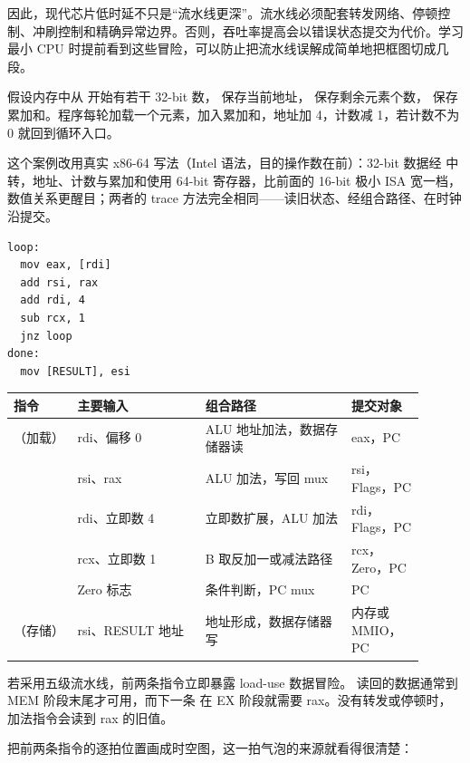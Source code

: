 因此，现代芯片低时延不只是“流水线更深”。流水线必须配套转发网络、停顿控制、冲刷控制和精确异常边界。否则，吞吐率提高会以错误状态提交为代价。学习最小 CPU 时提前看到这些冒险，可以防止把流水线误解成简单地把框图切成几段。

假设内存中从  开始有若干 32-bit 数， 保存当前地址， 保存剩余元素个数， 保存累加和。程序每轮加载一个元素，加入累加和，地址加 4，计数减 1，若计数不为 0 就回到循环入口。

这个案例改用真实 x86-64 写法（Intel 语法，目的操作数在前）：32-bit 数据经  中转，地址、计数与累加和使用 64-bit 寄存器，比前面的 16-bit 极小 ISA 宽一档，数值关系更醒目；两者的 trace 方法完全相同——读旧状态、经组合路径、在时钟沿提交。

\begin{lstlisting}
loop:
  mov eax, [rdi]
  add rsi, rax
  add rdi, 4
  sub rcx, 1
  jnz loop
done:
  mov [RESULT], esi
\end{lstlisting}

\begin{longtable}{L{0.14\linewidth}L{0.28\linewidth}L{0.32\linewidth}L{0.16\linewidth}}
\toprule
指令 & 主要输入 & 组合路径 & 提交对象 \\
\midrule
{}（加载） & rdi、偏移 0 & ALU 地址加法，数据存储器读 & eax，PC \\
 & rsi、rax & ALU 加法，写回 mux & rsi，Flags，PC \\
 & rdi、立即数 4 & 立即数扩展，ALU 加法 & rdi，Flags，PC \\
 & rcx、立即数 1 & B 取反加一或减法路径 & rcx，Zero，PC \\
 & Zero 标志 & 条件判断，PC mux & PC \\
（存储） & rsi、RESULT 地址 & 地址形成，数据存储器写 & 内存或 MMIO，PC \\
\bottomrule
\end{longtable}

若采用五级流水线，前两条指令立即暴露 load-use 数据冒险。 读回的数据通常到 MEM 阶段末尾才可用，而下一条  在 EX 阶段就需要 rax。没有转发或停顿时，加法指令会读到 rax 的旧值。

把前两条指令的逐拍位置画成时空图，这一拍气泡的来源就看得很清楚：


